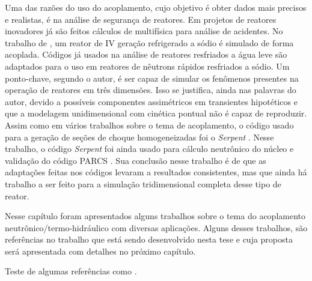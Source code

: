 
Uma das razões do uso do acoplamento, cujo objetivo é obter dados mais precisos e realistas, é na 
análise de segurança de reatores. Em projetos de reatores inovadores já são feitos cálculos de multifísica para 
análise de acidentes. No trabalho de \cite{Lazaro2013}, um reator de IV geração refrigerado a sódio 
é simulado de forma acoplada. Códigos já usados na análise de reatores resfriados a água leve são adaptados 
para o uso em reatores de nêutrons rápidos resfriados a sódio. Um ponto-chave, segundo o autor, é ser capaz 
de simular os fenômenos presentes na operação de reatores em três dimensões. Isso se justifica, ainda nas 
palavras do autor, devido a possíveis componentes assimétricos em transientes hipotéticos e que 
a modelagem unidimensional com cinética pontual não é capaz de reproduzir. Assim como em vários trabalhos 
sobre o tema de acoplamento, o código usado para a geração de seções de choque homogeneizadas 
foi o \textit{Serpent} \cite{Serpent2013}. Nesse trabalho, o código \textit{Serpent} foi ainda usado 
para cálculo neutrônico do núcleo e validação do código PARCS \cite{PARCS2006}. Sua conclusão nesse trabalho 
é de que as adaptações feitas nos códigos levaram a resultados consistentes, mas que ainda há trabalho 
a ser feito para a simulação tridimensional completa desse tipo de reator.

Nesse capítulo foram apresentados alguns trabalhos sobre o tema do acoplamento neutrônico/termo-hidráulico 
com diversas aplicações. Alguns desses trabalhos, são referências no trabalho que está sendo desenvolvido 
nesta tese e cuja proposta será apresentada com detalhes no próximo capítulo.

Teste de algumas referências como \cite{Fiorina2015}.


%

%    
%    



